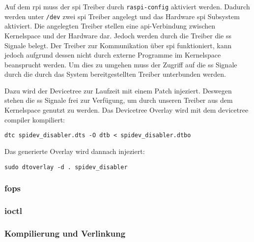 

Auf dem \gls{rpi} muss der \gls{spi} Treiber durch \texttt{raspi-config} aktiviert werden.
Dadurch werden unter \texttt{/dev} zwei \gls{spi} Treiber angelegt und das Hardware \gls{spi} Subsystem aktiviert.
Die angelegten Treiber stellen eine \gls{api}-Verbindung zwischen Kernelspace und der Hardware dar.
Jedoch werden durch die Treiber die \gls{ss} Signale belegt.
Der Treiber zur Kommunikation über \gls{spi} funktioniert, kann jedoch aufgrund dessen nicht durch externe Programme im Kernelspace beansprucht werden.
Um dies zu umgehen muss der Zugriff auf die \gls{ss} Signale durch die durch das System bereitgestellten Treiber unterbunden werden.

Dazu wird der Devicetree zur Laufzeit mit einem Patch injeziert.
Deswegen stehen die \gls{ss} Signale frei zur Verfügung, um durch unseren Treiber aus dem Kernelspace genutzt zu werden.
Das Devicetree Overlay wird mit dem devicetree compiler kompiliert:
\begin{lstlisting}
dtc spidev_disabler.dts -O dtb < spidev_disabler.dtbo
\end{lstlisting}
Das generierte Overlay wird dannach injeziert:
\begin{lstlisting}
sudo dtoverlay -d . spidev_disabler
\end{lstlisting}

\subsubsection{\acrshort{fops}}

\subsubsection{\Acrshort{ioctl}}

\subsubsection{Kompilierung und Verlinkung}
